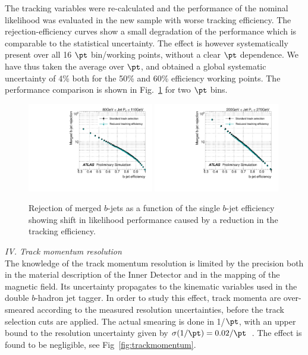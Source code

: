 The tracking variables were re-calculated and the performance of the nominal likelihood was evaluated in the new sample with worse tracking efficiency. The rejection-efficiency curves %
 show a small degradation of the performance which is comparable to the statistical uncertainty. The effect is however systematically present over all 16 $\pt$ bin/working points, without a clear $\pt$ dependence. We have thus taken the average over $\pt$, and obtained a global systematic uncertainty of 4\% both for the 50\% and 60\% efficiency working points. The performance comparison is shown in Fig.~\ref{fig:trackefficiency} for two $\pt$ bins. %

\begin{figure}[tp]
\centering
\includegraphics[width=0.49\textwidth]{FIGS/systematics/LlhoodKDE_ISO_TrackingUncertaintyTest_rejvseff080.pdf}
\includegraphics[width=0.49\textwidth]{FIGS/systematics/LlhoodKDE_ISO_TrackingUncertaintyTest_rejvseff200.pdf}
\caption{Rejection of merged $b$-jets as a function of the single $b$-jet efficiency showing shift in likelihood performance caused by a reduction in the tracking efficiency.}
\label{fig:trackefficiency}
\end{figure}

\vspace{3mm}
{\em IV. Track momentum resolution}
\\[3mm]
The knowledge of the track momentum resolution is limited by the precision both in the material description of the Inner Detector and in the mapping of the magnetic field. Its uncertainty propagates to the kinematic variables used in the double $b$-hadron jet tagger. In order to study this effect, track momenta are over-smeared according to the measured resolution uncertainties, before the track selection cuts are applied.  %
The actual smearing is done in 1/$\pt$, with an upper bound to the resolution uncertainty given by $\sigma(1/\pt)=0.02/\pt$~\cite{ATLAS-CONF-2010-009}. The effect is found to be negligible, see Fig~\ref{fig:trackmomentum}. %


